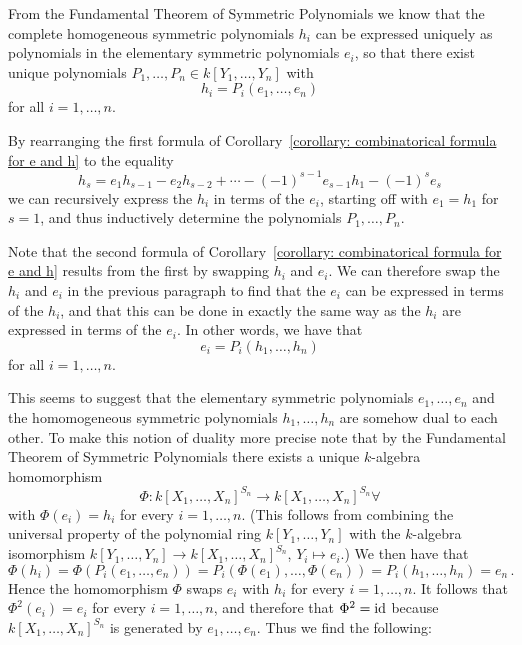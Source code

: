 \begin{fluff}
  From the Fundamental Theorem of Symmetric Polynomials we know that the complete homogeneous symmetric polynomials $h_i$ can be expressed uniquely as polynomials in the elementary symmetric polynomials $e_i$, so that there exist unique polynomials $P_1, \dotsc, P_n \in k[Y_1, \dotsc, Y_n]$ with
  \[
      h_i
    = P_i(e_1, \dotsc, e_n)
  \]
  for all $i = 1, \dotsc, n$.
  
  By rearranging the first formula of Corollary~\ref{corollary: combinatorical formula for e and h} to the equality
  \[
      h_s
    =   e_1 h_{s-1}
      - e_2 h_{s-2}
      + \dotsb
      - (-1)^{s-1} e_{s-1} h_1
      - (-1)^s e_s
  \]
  we can recursively express the $h_i$ in terms of the $e_i$, starting off with $e_1 = h_1$ for $s = 1$, and thus inductively determine the polynomials $P_1, \dotsc, P_n$.
  
  Note that the second formula of Corollary~\ref{corollary: combinatorical formula for e and h} results from the first by swapping $h_i$ and $e_i$.
  We can therefore swap the $h_i$ and $e_i$ in the previous paragraph to find that the $e_i$ can be expressed in terms of the $h_i$, and that this can be done in exactly the same way as the $h_i$ are expressed in terms of the $e_i$.
  In other words, we have that
  \[
      e_i
    = P_i(h_1, \dotsc, h_n)
  \]
  for all $i = 1, \dotsc, n$.
  
  This seems to suggest that the elementary symmetric polynomials $e_1, \dotsc, e_n$ and the homomogeneous symmetric polynomials $h_1, \dotsc, h_n$ are somehow dual to each other.
  To make this notion of duality more precise note that by the Fundamental Theorem of Symmetric Polynomials there exists a unique $k$-algebra homomorphism
  \[
            \Phi
    \colon  k[X_1, \dotsc, X_n]^{S_n}
    \to     k[X_1, \dotsc, X_n]^{S_n}∀
  \]
  with $\Phi(e_i) = h_i$ for every $i = 1, \dotsc, n$.
  (This follows from combining the universal property of the polynomial ring $k[Y_1, \dotsc, Y_n]$ with the $k$-algebra isomorphism $k[Y_1, \dotsc, Y_n] \to k[X_1, \dotsc, X_n]^{S_n}$, $Y_i \mapsto e_i$.)
  We then have that
  \[
      \Phi(h_i)
    = \Phi( P_i(e_1, \dotsc, e_n) )
    = P_i( \Phi(e_1), \dotsc, \Phi(e_n) )
    = P_i( h_1, \dotsc, h_n )
    = e_n \,.
  \]
  Hence the homomorphism $\Phi$ swaps $e_i$ with $h_i$ for every $i = 1, \dotsc, n$.
  It follows that $\Phi^2(e_i) = e_i$ for every $i = 1, \dotsc, n$, and therefore that $\Phi^2 = \operatorname{id}$ because $k[X_1, \dotsc, X_n]^{S_n}$ is generated by $e_1, \dotsc, e_n$.
  Thus we find the following:
\end{fluff}

